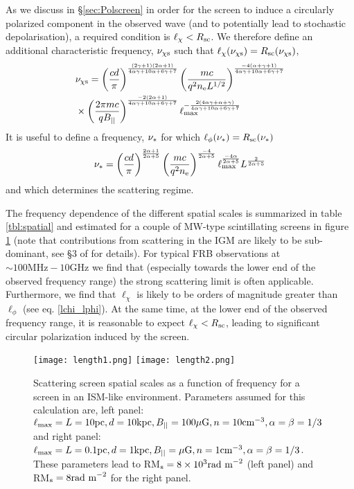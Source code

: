 \documentclass[fleqn,usenatbib]{mnras}
\begin{document}
	
	As we discuss in \S \ref{sec:Polscreen} in order for the screen to induce a circularly polarized component in the observed wave (and to potentially lead to stochastic depolarisation), a required condition is $\ell_{\chi}<R_{\rm sc}$.
	We therefore define an additional characteristic frequency, $\nu_{\chi \rm s}$ such that $\ell_{\chi}(\nu_{\chi \rm s})=R_{\rm sc}(\nu_{\chi \rm s})$,
	\begin{eqnarray}
		\label{eq:nuchis}
		&\nu_{\chi\rm s}=\left(\frac{cd}{\pi}\right)^{(2\gamma+1)(2\alpha+1)\over 4\alpha\gamma+10\alpha+6\gamma+7}\left( {m c  \over q^2 n_{\rm e} L^{1/2}}\right)^{-4(\alpha+\gamma+1)\over 4\alpha\gamma+10\alpha+6\gamma+7} \\ & \times  \left( {2\pi m c \over qB_{||}}\right)^{-2(2\alpha+1)\over4\alpha\gamma+10\alpha+6\gamma+7} \ell_{\rm max}^{-{2(4\alpha\gamma+\alpha+\gamma)\over 4\alpha\gamma+10\alpha+6\gamma+7}}\nonumber
	\end{eqnarray}
	It is useful to define a frequency, $\nu_{\rm *}$ for which $\ell_{\phi}(\nu_*)=R_{\rm sc}(\nu_*)$
	\begin{eqnarray}
		\label{eq:nustar}
		\nu_*=\left(\frac{cd}{\pi}\right)^{2\alpha+1\over 2\alpha+5} \left( {m c \over q^2 n_{\rm e} }\right)^{-4\over 2\alpha+5}\ell_{\rm max}^{-4\alpha\over 2\alpha+5}L^{2\over 2\alpha+5}
	\end{eqnarray}
	and which determines the scattering regime.
	
	
	The frequency dependence of the different spatial scales is summarized in table \ref{tbl:spatial} and estimated for a couple of MW-type scintillating screens in figure \ref{fig:spatialscales}  (note that contributions from scattering in the IGM are likely to be sub-dominant, see \S 3 of \cite{BK2020} for details). For typical FRB observations at $\sim 100\mbox{MHz}-10\mbox{GHz}$ we find that (especially towards the lower end of the observed frequency range) the strong scattering limit is often applicable. Furthermore, we find that $\ell_{\chi}$ is likely to be orders of magnitude greater than $\ell_{\phi}$ (see eq. \ref{lchi_lphi}). At the same time, at the lower end of the observed frequency range, it is reasonable to expect $\ell_{\chi}<R_{\rm sc}$, leading to significant circular polarization induced by the screen.
	
	
	\begin{figure*}
		\centering
		\texttt{[image: length1.png]}
		\texttt{[image: length2.png]}
		\caption{Scattering screen spatial scales as a function of frequency for a screen in an ISM-like environment. Parameters assumed for this calculation are, left panel: $\ell_{\rm max}=L=10\mbox{pc},d=10\mbox{kpc},B_{||}=100\mu\mbox{G},n=10\mbox{cm}^{-3}, \alpha=\beta=1/3$ and right panel: $\ell_{\rm max}=L=0.1\mbox{pc},d=1\mbox{kpc},B_{||}=\mu\mbox{G},n=1\mbox{cm}^{-3}, \alpha=\beta=1/3$. These parameters lead to RM$_{\rm s}=8\times 10^3\mbox{rad m}^{-2}$ (left panel) and RM$_{\rm s}=8\mbox{rad m}^{-2}$ for the right panel.}
		\label{fig:spatialscales}
	\end{figure*}
	
\end{document}
